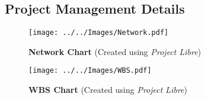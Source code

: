 \begin{landscapes}
    \section{Project Management Details}

    
    \begin{figure}[H]
        \centering
        \texttt{[image: ../../Images/Network.pdf]}
        \caption{\textbf{Network Chart} {(Created using \textit{Project Libre})}}
    \end{figure}
    
    \newpage
    
    \begin{figure}[H]
        \centering
        \texttt{[image: ../../Images/WBS.pdf]}
        \caption{\textbf{\ac{WBS} Chart} {(Created using \textit{Project Libre})}}
    \end{figure}

\end{landscapes}
